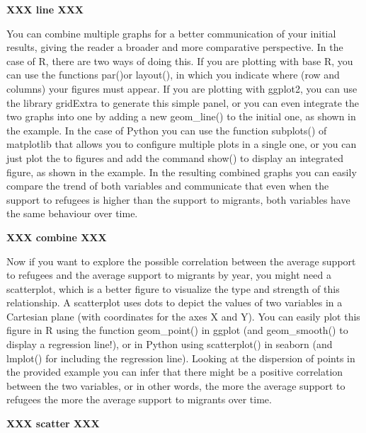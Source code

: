 \textbf{XXX  line  XXX}

You can combine multiple graphs for a better communication of your initial results, giving the reader a broader and more comparative perspective. In the case of R, there are two ways of doing this. If you are plotting with base R, you can use the functions par()or layout(), in which you indicate where (row and columns) your figures must appear. If you are plotting with ggplot2, you can use the library gridExtra to generate this simple panel, or you can even integrate the two graphs into one by adding a new geom\_line() to the initial one, as shown in the example. In the case of Python you can use the function subplots() of matplotlib that allows you to configure multiple plots in a single one, or you can just plot the to figures and add the command show() to display an integrated figure, as shown in the example.  In the resulting combined graphs you can easily compare the trend of both variables and communicate that even when the support to refugees is higher than the support to migrants, both variables have the same behaviour over time.

\textbf{XXX  combine  XXX}

Now if you want to explore the possible correlation between the average support to refugees and the average support to migrants by year, you might need a scatterplot, which is a better figure to visualize the type and strength of this relationship. A scatterplot uses dots to depict the values of two variables in a Cartesian plane (with coordinates for the axes X and Y). You can easily plot this figure in R using the function geom\_point() in ggplot (and geom\_smooth() to display a regression line!), or in Python using scatterplot() in seaborn (and lmplot() for including the regression line). Looking at the dispersion of points in the provided example you can infer that there might be a positive correlation between the two variables, or in other words, the more the average support to refugees the more the average support to migrants over time.

\textbf{XXX  scatter  XXX}

